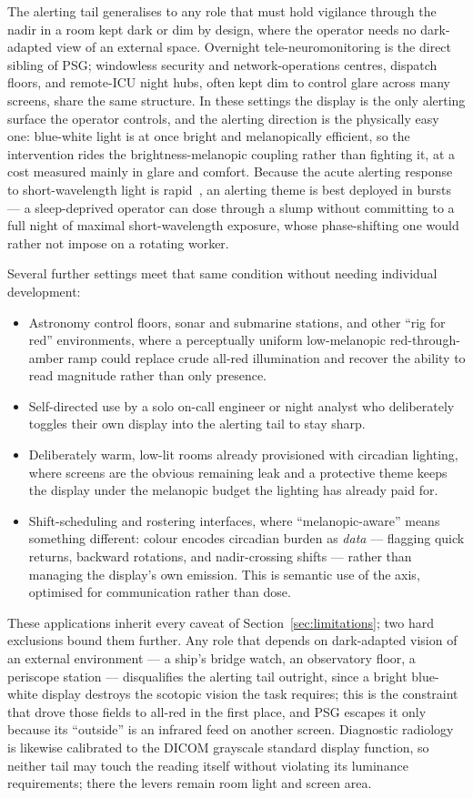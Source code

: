 \documentclass[10pt,a4paper,twocolumn]{article}
\begin{document}
The alerting tail generalises to any role that must hold vigilance through the nadir in a room kept dark or dim by design, where the operator needs no dark-adapted view of an external space.
Overnight tele-neuromonitoring is the direct sibling of PSG; windowless security and network-operations centres, dispatch floors, and remote-ICU night hubs, often kept dim to control glare across many screens, share the same structure.
In these settings the display is the only alerting surface the operator controls, and the alerting direction is the physically easy one: blue-white light is at once bright and melanopically efficient, so the intervention rides the brightness-melanopic coupling rather than fighting it, at a cost measured mainly in glare and comfort.
Because the acute alerting response to short-wavelength light is rapid~\cite{lockley2006shortwave}, an alerting theme is best deployed in bursts --- a sleep-deprived operator can dose through a slump without committing to a full night of maximal short-wavelength exposure, whose phase-shifting one would rather not impose on a rotating worker.

Several further settings meet that same condition without needing individual development:
\begin{itemize}
  \item Astronomy control floors, sonar and submarine stations, and other ``rig for red'' environments, where a perceptually uniform low-melanopic red-through-amber ramp could replace crude all-red illumination and recover the ability to read magnitude rather than only presence.
  \item Self-directed use by a solo on-call engineer or night analyst who deliberately toggles their own display into the alerting tail to stay sharp.
  \item Deliberately warm, low-lit rooms already provisioned with circadian lighting, where screens are the obvious remaining leak and a protective theme keeps the display under the melanopic budget the lighting has already paid for.
  \item Shift-scheduling and rostering interfaces, where ``melanopic-aware'' means something different: colour encodes circadian burden as \emph{data} --- flagging quick returns, backward rotations, and nadir-crossing shifts --- rather than managing the display's own emission. This is semantic use of the axis, optimised for communication rather than dose.
\end{itemize}

These applications inherit every caveat of Section~\ref{sec:limitations}; two hard exclusions bound them further.
Any role that depends on dark-adapted vision of an external environment --- a ship's bridge watch, an observatory floor, a periscope station --- disqualifies the alerting tail outright, since a bright blue-white display destroys the scotopic vision the task requires; this is the constraint that drove those fields to all-red in the first place, and PSG escapes it only because its ``outside'' is an infrared feed on another screen.
Diagnostic radiology is likewise calibrated to the DICOM grayscale standard display function, so neither tail may touch the reading itself without violating its luminance requirements; there the levers remain room light and screen area.
\end{document}
